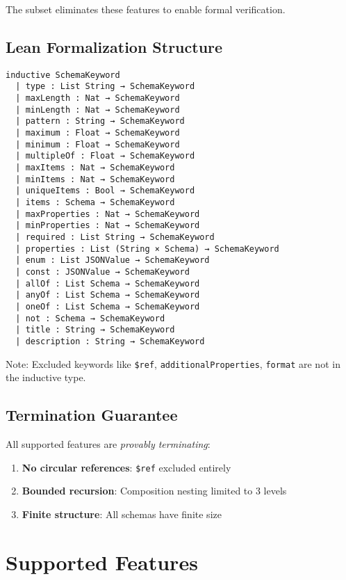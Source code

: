 The subset eliminates these features to enable formal verification.

\subsection{Lean Formalization Structure}

\begin{verbatim}
inductive SchemaKeyword
  | type : List String → SchemaKeyword
  | maxLength : Nat → SchemaKeyword
  | minLength : Nat → SchemaKeyword
  | pattern : String → SchemaKeyword
  | maximum : Float → SchemaKeyword
  | minimum : Float → SchemaKeyword
  | multipleOf : Float → SchemaKeyword
  | maxItems : Nat → SchemaKeyword
  | minItems : Nat → SchemaKeyword
  | uniqueItems : Bool → SchemaKeyword
  | items : Schema → SchemaKeyword
  | maxProperties : Nat → SchemaKeyword
  | minProperties : Nat → SchemaKeyword
  | required : List String → SchemaKeyword
  | properties : List (String × Schema) → SchemaKeyword
  | enum : List JSONValue → SchemaKeyword
  | const : JSONValue → SchemaKeyword
  | allOf : List Schema → SchemaKeyword
  | anyOf : List Schema → SchemaKeyword
  | oneOf : List Schema → SchemaKeyword
  | not : Schema → SchemaKeyword
  | title : String → SchemaKeyword
  | description : String → SchemaKeyword
\end{verbatim}

Note: Excluded keywords like \texttt{\$ref}, \texttt{additionalProperties}, \texttt{format} are not in the inductive type.

\subsection{Termination Guarantee}

All supported features are \emph{provably terminating}:

\begin{enumerate}
  \item \textbf{No circular references}: \texttt{\$ref} excluded entirely
  \item \textbf{Bounded recursion}: Composition nesting limited to 3 levels
  \item \textbf{Finite structure}: All schemas have finite size
\end{enumerate}

\section{Supported Features}

